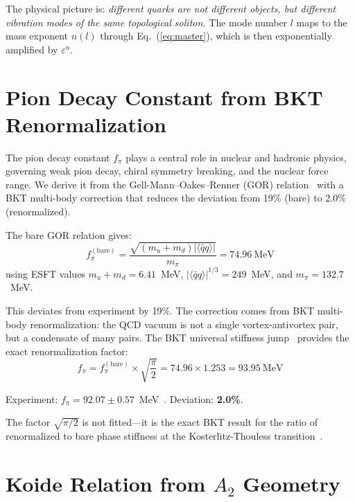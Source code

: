 ﻿\documentclass[twocolumn,preprintnumbers,amsmath,amssymb,prd]{revtex4-2}
\begin{document}
The physical picture is: \emph{different quarks are not different objects, but different vibration modes of the same topological soliton.} The mode number $l$ maps to the mass exponent $n(l)$ through Eq.~(\ref{eq:master}), which is then exponentially amplified by $\varepsilon^n$.

\section{Pion Decay Constant from BKT Renormalization}
\label{sec:fpi}

The pion decay constant $f_\pi$ plays a central role in nuclear and hadronic physics, governing weak pion decay, chiral symmetry breaking, and the nuclear force range. We derive it from the Gell-Mann--Oakes--Renner (GOR) relation~\cite{GOR} with a BKT multi-body correction that reduces the deviation from 19\% (bare) to 2.0\% (renormalized).

The bare GOR relation gives:
\begin{equation}
f_\pi^{(\text{bare})} = \frac{\sqrt{(m_u+m_d)|\langle\bar{q}q\rangle|}}{m_\pi} = 74.96~\text{MeV}
\end{equation}
using ESFT values $m_u + m_d = 6.41$~MeV, $|\langle\bar{q}q\rangle|^{1/3} = 249$~MeV, and $m_\pi = 132.7$~MeV.

This deviates from experiment by 19\%. The correction comes from BKT multi-body renormalization: the QCD vacuum is not a single vortex-antivortex pair, but a condensate of many pairs. The BKT universal stiffness jump~\cite{Nelson1977} provides the exact renormalization factor:
\begin{equation}
f_\pi = f_\pi^{(\text{bare})} \times \sqrt{\frac{\pi}{2}} = 74.96 \times 1.253 = \boxed{93.95~\text{MeV}}
\label{eq:fpi}
\end{equation}

Experiment: $f_\pi = 92.07 \pm 0.57$~MeV~\cite{PDG2024}. Deviation: \textbf{2.0\%}.

The factor $\sqrt{\pi/2}$ is not fitted---it is the exact BKT result for the ratio of renormalized to bare phase stiffness at the Kosterlitz-Thouless transition~\cite{Kosterlitz1973}.

\section{Koide Relation from $A_2$ Geometry}
\label{sec:koide}
\end{document}

